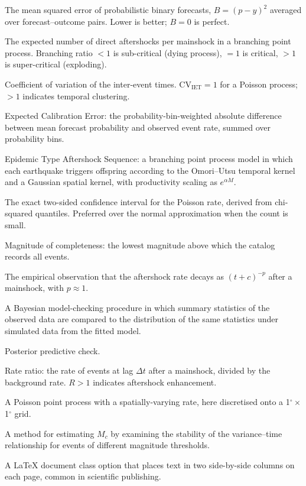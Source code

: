 \documentclass[10pt,a4paper,twocolumn]{article}
\begin{document}
\begin{description}[leftmargin=1.2em,itemsep=2pt,topsep=2pt]
\item[Brier score] The mean squared error of probabilistic binary forecasts, $B = (p - y)^2$ averaged over forecast--outcome pairs. Lower is better; $B=0$ is perfect.
\item[Branching ratio] The expected number of direct aftershocks per mainshock in a branching point process. Branching ratio $<1$ is sub-critical (dying process), $=1$ is critical, $>1$ is super-critical (exploding).
\item[CV$_{\text{IET}}$] Coefficient of variation of the inter-event times. CV$_{\text{IET}}=1$ for a Poisson process; $>1$ indicates temporal clustering.
\item[ECE] Expected Calibration Error: the probability-bin-weighted absolute difference between mean forecast probability and observed event rate, summed over probability bins.
\item[ETAS] Epidemic Type Aftershock Sequence: a branching point process model in which each earthquake triggers offspring according to the Omori--Utsu temporal kernel and a Gaussian spatial kernel, with productivity scaling as $e^{\alpha M}$.
\item[Garwood interval] The exact two-sided confidence interval for the Poisson rate, derived from chi-squared quantiles. Preferred over the normal approximation when the count is small.
\item[$M_c$] Magnitude of completeness: the lowest magnitude above which the catalog records all events.
\item[Omori law] The empirical observation that the aftershock rate decays as $(t+c)^{-p}$ after a mainshock, with $p\approx1$.
\item[Posterior predictive check] A Bayesian model-checking procedure in which summary statistics of the observed data are compared to the distribution of the same statistics under simulated data from the fitted model.
\item[PPC] Posterior predictive check.
\item[R$(\Delta t)$] Rate ratio: the rate of events at lag $\Delta t$ after a mainshock, divided by the background rate. $R>1$ indicates aftershock enhancement.
\item[Spatial Poisson] A Poisson point process with a spatially-varying rate, here discretised onto a 1$^\circ\times$1$^\circ$ grid.
\item[Stepp analysis] A method for estimating $M_c$ by examining the stability of the variance--time relationship for events of different magnitude thresholds.
\item[Twocolumn] A LaTeX document class option that places text in two side-by-side columns on each page, common in scientific publishing.
\end{description}
\end{document}
